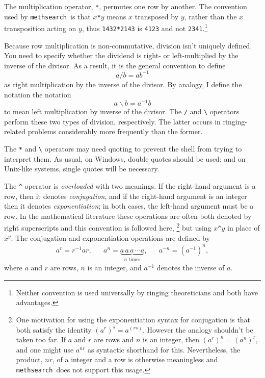 \documentclass[a4paper,11pt,oneside]{book}
\def\textitidx#1{\textit{#1}\index{#1}}
\def\methsearch{\texttt{meth\-search}}
\begin{document}
The multiplication operator, \verb+*+, 
permutes one row by another.  The convention used by 
\methsearch\ is that $x$\verb+*+$y$ means $x$ transposed by $y$, rather
than the $x$ transposition acting on $y$, thus \verb+1432*2143+ is 
\verb+4123+ and not \verb+2341+.\footnote{Neither convention is used 
universally by ringing theoreticians and both have advantages.}

Because row multiplication is non-commutative, 
division isn't uniquely defined.  
You need to specify whether the dividend is right- or
left-multiplied by the inverse of the divisor.  As a result, it is the
general convention to define
\[ a/b = a b^{-1} \]
as right multiplication by the inverse of the divisor.  By analogy, I 
define the notation the notation
\[  a\backslash b = a^{-1} b \]
to mean left multiplication by inverse of the divisor.  The \verb+/+ and
\verb+\+ operators perform these two types of division, respectively.
The latter occurs in ringing-related problems considerably more frequently 
than the former.

The \verb+*+ and \verb+\+ operators may need quoting
to prevent the shell from trying to interpret them.  As usual, on Windows, 
double quotes should be used; and on Unix-like systems, single quotes will 
be necessary.

The \verb+^+ operator is \textit{overloaded} 
with two meanings.  If the right-hand argument is a row, 
then it denotes \textitidx{conjugation}, and if the right-hand
argument is an integer then it denotes \textitidx{exponentiation};
in both cases, the left-hand argument must be a row.  In the mathematical
literature these operations are often both denoted by right superscripts
and this convention is followed here,%
\footnote{One motivation for using the exponentiation syntax for conjugation
is that both satisfy the identity $(a^r)^s =  a^{(rs)}$.  However the analogy 
shouldn't be taken too far.  If $a$ and $r$ are rows and $n$ is an integer,
then $(a^r)^n = (a^n)^r$, and one might use $a^{nr}$ as syntactic shorthand 
for this.  Nevertheless, the product, $nr$, of a integer and a row is 
otherwise meaningless and \methsearch\ does not support this usage.}
but using $x$\verb+^+$y$ in place of $x^y$.
The conjugation and exponentiation operations are defined by
\begin{align*}
a^r = r^{-1} a r, && 
a^n = \underbrace{a\,a\,a\,\dotsm a}_{\text{$n$ times}}, &&
a^{-n} = (a^{-1})^n,
\end{align*}
where $a$ and $r$ are rows, $n$ is an integer, and
$a^{-1}$ denotes the inverse of $a$.
\end{document}

